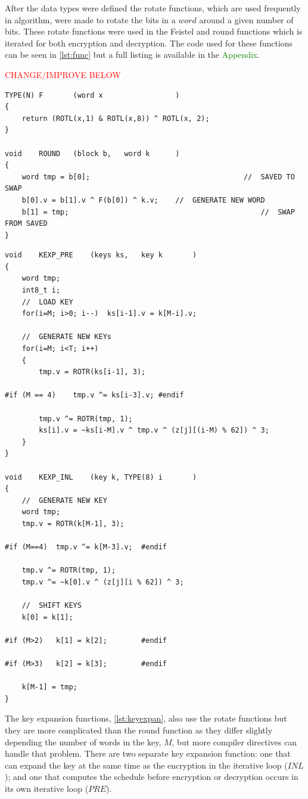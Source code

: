 \documentclass[12pt,twoside,a4paper]{report}
\begin{document}
	After the data types were defined the rotate functions, which are used frequently in algorithm, were made to rotate the bits in a $word$ around a given number of bits. These rotate functions were used in the Feistel and round functions which is iterated for both encryption and decryption. The code used for these functions can be seen in \autoref{lst:func} but a full listing is available in the \textcolor{green}{Appendix}. 
    
	\textcolor{red}{CHANGE/IMPROVE BELOW} 
	
	\begin{minipage}{\linewidth}
	\begin{lstlisting}[label={lst:func},caption={Round and Feistel functions},style=CStyle]
TYPE(N)	F		(word x					)
{
	return (ROTL(x,1) & ROTL(x,8)) ^ ROTL(x, 2);
}

void	ROUND	(block b,	word k		)
{	
	word tmp = b[0];									//	SAVED TO SWAP
	b[0].v = b[1].v ^ F(b[0]) ^ k.v;	//	GENERATE NEW WORD
	b[1] = tmp;												//	SWAP FROM SAVED
}
	\end{lstlisting}
	\end{minipage}
	
	\begin{minipage}{\linewidth}
	\begin{lstlisting}[label={lst:keyexpan},caption={Key Expansion Functions},style=CStyle]
void	KEXP_PRE	(keys ks,	key k		)
{
	word tmp;
	int8_t i;
	//	LOAD KEY
	for(i=M; i>0; i--)	ks[i-1].v = k[M-i].v;
	
	//	GENERATE NEW KEYs
	for(i=M; i<T; i++)
	{
		tmp.v = ROTR(ks[i-1], 3);
		
#if (M == 4)	tmp.v ^= ks[i-3].v;	#endif

		tmp.v ^= ROTR(tmp, 1);
		ks[i].v = ~ks[i-M].v ^ tmp.v ^ (z[j][(i-M) % 62]) ^ 3;
	}
}

void	KEXP_INL	(key k,	TYPE(8) i		)
{
	//	GENERATE NEW KEY	
	word tmp;
	tmp.v = ROTR(k[M-1], 3);
	
#if (M==4)	tmp.v ^= k[M-3].v;	#endif

	tmp.v ^= ROTR(tmp, 1);
	tmp.v ^= ~k[0].v ^ (z[j][i % 62]) ^ 3;
	
	//	SHIFT KEYS
	k[0] = k[1];
	
#if (M>2)	k[1] = k[2];		#endif

#if (M>3)	k[2] = k[3];		#endif

	k[M-1] = tmp;
}
	\end{lstlisting}
	\end{minipage}
	
	The key expansion functions, \autoref{lst:keyexpan}, also use the rotate functions but they are more complicated than the round function as they differ slightly depending the number of words in the key, $M$, but more compiler directives can handle that problem. There are two separate key expansion function: one that can expand the key at the same time as the encryption in the iterative loop ($INL$); and one that computes the schedule before encryption or decryption occurs in its own iterative loop ($PRE$).
    
\end{document}
